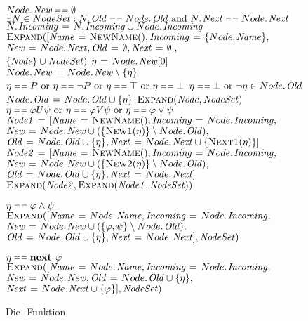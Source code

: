 \begin{figure}
\begin{codebox}
\li \If $\attrib{Node}{New}\isequal\emptyset$ \Then
\li \If $\exists N\in NodeSet: \attrib{N}{Old}\isequal\attrib{Node}{Old} \mbox{ and } \attrib{N}{Next}\isequal\attrib{Node}{Next}$ \Then
\li $\attrib{N}{Incoming}\gets \attrib{N}{Incoming}\cup\attrib{Node}{Incoming}$
\li \Return {}
\li \Else \Return $\proc{Expand}([\id{Name}\gets \proc{NewName}(),\id{Incoming}\gets \{\attrib{Node}{Name}\},$
\Startalign{\Return $\proc{Expand}([$}
\> $\id{New}\gets\attrib{Node}{Next}, \id{Old}\gets\emptyset, \id{Next}\gets\emptyset],$\\
\> $\{\id{Node}\}\cup \id{NodeSet})$
\Stopalign
\End
\li \Else
\li $\eta\gets \attrib{Node}{New}[0]$
\li $\attrib{Node}{New}\gets\attrib{Node}{New}\setminus\{\eta\}$
\li \If $\eta\isequal P\mbox{ or }\eta\isequal\lnot P\mbox{ or }\eta\isequal\top\mbox{ or }\eta\isequal\bot$ \Then
\li \If $\eta\isequal\bot\mbox{ or }\lnot\eta\in\attrib{Node}{Old}$
\li \Then \Return {}
\li \Else
\li $\attrib{Node}{Old}\gets \attrib{Node}{Old}\cup\{\eta\}$
\li \Return $\proc{Expand}(\id{Node},\id{NodeSet})$
\End
\li \ElseIf $\eta\isequal\varphi U\psi\mbox{ or }\eta\isequal\varphi V\psi\mbox{ or }\eta\isequal\varphi\lor\psi$ \Then
\li $\id{Node1}\gets [\id{Name}\gets\proc{NewName}(),\id{Incoming}\gets\attrib{Node}{Incoming},$
\Startalign{$\id{Node1}\gets [$}
\> $\id{New}\gets\attrib{Node}{New}\cup(\{\proc{New1}(\eta)\}\setminus\attrib{Node}{Old}),$\\
\> $\id{Old}\gets\attrib{Node}{Old}\cup\{\eta\},\id{Next}\gets\attrib{Node}{Next}\cup\{\proc{Next1}(\eta)\}]$
\Stopalign
\li $\id{Node2}\gets [\id{Name}\gets\proc{NewName}(),\id{Incoming}\gets\attrib{Node}{Incoming},$
\Startalign{$\id{Node2}\gets [$}
\> $\id{New}\gets\attrib{Node}{New}\cup(\{\proc{New2}(\eta)\}\setminus\attrib{Node}{Old}),$\\
\> $\id{Old}\gets\attrib{Node}{Old}\cup\{\eta\},\id{Next}\gets\attrib{Node}{Next} ]$
\Stopalign
\li \Return $\proc{Expand}(\id{Node2},\proc{Expand}(\id{Node1},\id{NodeSet}))$

\li \ElseIf $\eta\isequal\varphi\land\psi$\Then
\li \Return $\proc{Expand}([\id{Name}\gets\attrib{Node}{Name},\id{Incoming}\gets\attrib{Node}{Incoming},$
\Startalign{\Return $\proc{Expand}([$}
\> $\id{New}\gets\attrib{Node}{New}\cup(\{\varphi,\psi\}\setminus\attrib{Node}{Old}),$\\
\> $\id{Old}\gets\attrib{Node}{Old}\cup\{\eta\},\id{Next}\gets\attrib{Node}{Next}],\id{NodeSet})$
\Stopalign

\li \ElseIf $\eta\isequal \textbf{next }\varphi$ \Then
\li \Return $\proc{Expand}([\id{Name}\gets\attrib{Node}{Name},\id{Incoming}\gets\attrib{Node}{Incoming},$
\Startalign{\Return $\proc{Expand}([$}
\> $\id{New}\gets\attrib{Node}{New},\id{Old}\gets\attrib{Node}{Old}\cup\{\eta\},$\\
\> $\id{Next}\gets\attrib{Node}{Next}\cup\{\varphi\}],\id{NodeSet})$
\Stopalign
\End
\End
\end{codebox}
\caption{Die -Funktion}
\label{fig:expand_function}
\end{figure}
